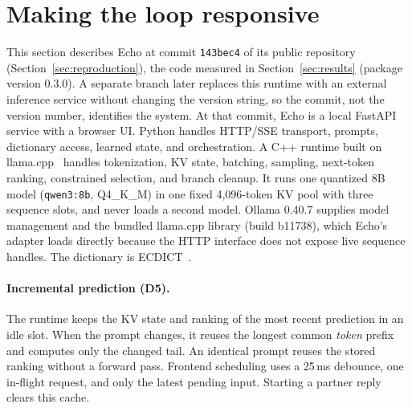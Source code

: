 \documentclass[11pt,a4paper]{article}
\newcommand{\code}[1]{\texttt{#1}}
\begin{document}
\section{Making the loop responsive}
\label{sec:implementation}
This section describes Echo at commit \code{143bec4} of its public repository (Section~\ref{sec:reproduction}), the code measured in Section~\ref{sec:results} (package version 0.3.0). A separate branch later replaces this runtime with an external inference service without changing the version string, so the commit, not the version number, identifies the system. At that commit, Echo is a local FastAPI service with a browser UI. Python handles HTTP/SSE transport, prompts, dictionary access, learned state, and orchestration. A C++ runtime built on llama.cpp~\cite{llamacpp} handles tokenization, KV state, batching, sampling, next-token ranking, constrained selection, and branch cleanup. It runs one quantized 8B model (\code{qwen3:8b}, Q4\_K\_M) in one fixed 4,096-token KV pool with three sequence slots, and never loads a second model. Ollama 0.40.7 supplies model management and the bundled llama.cpp library (build b11738), which Echo's adapter loads directly because the HTTP interface does not expose live sequence handles. The dictionary is ECDICT~\cite{ecdict}.

\paragraph{Incremental prediction (D5).} The runtime keeps the KV state and ranking of the most recent prediction in an idle slot. When the prompt changes, it reuses the longest common \emph{token} prefix and computes only the changed tail. An identical prompt reuses the stored ranking without a forward pass. Frontend scheduling uses a 25\,ms debounce, one in-flight request, and only the latest pending input. Starting a partner reply clears this cache.
\end{document}
